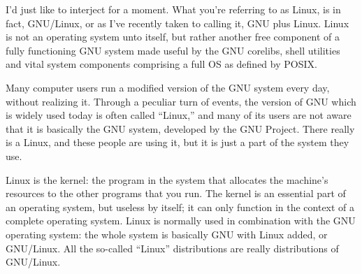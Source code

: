 I'd just like to interject for a moment. What you're referring to as Linux, is in fact, GNU/Linux, or as I've recently taken to calling it, GNU plus Linux. Linux is not an operating system unto itself, but rather another free component of a fully functioning GNU system made useful by the GNU corelibs, shell utilities and vital system components comprising a full OS as defined by POSIX.


Many computer users run a modified version of the GNU system every day, without realizing it. Through a peculiar turn of events, the version of GNU which is widely used today is often called “Linux,” and many of its users are not aware that it is basically the GNU system, developed by the GNU Project. There really is a Linux, and these people are using it, but it is just a part of the system they use.


Linux is the kernel: the program in the system that allocates the machine's resources to the other programs that you run. The kernel is an essential part of an operating system, but useless by itself; it can only function in the context of a complete operating system. Linux is normally used in combination with the GNU operating system: the whole system is basically GNU with Linux added, or GNU/Linux. All the so-called “Linux” distributions are really distributions of GNU/Linux.
